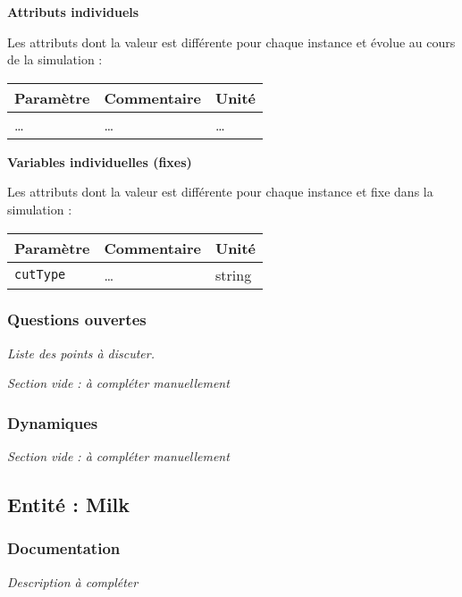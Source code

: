 \documentclass[
]{article}
\begin{document}
\textbf{Attributs individuels}

Les attributs dont la valeur est différente pour chaque instance et
évolue au cours de la simulation :

\begin{longtable}[]{@{}lll@{}}
\toprule\noalign{}
\textbf{Paramètre} & \textbf{Commentaire} & \textbf{Unité} \\
\midrule\noalign{}
\endhead
\bottomrule\noalign{}
\endlastfoot
\ldots{} & \ldots{} & \ldots{} \\
\end{longtable}

\textbf{Variables individuelles (fixes)}

Les attributs dont la valeur est différente pour chaque instance et fixe
dans la simulation :

\begin{longtable}[]{@{}lll@{}}
\toprule\noalign{}
\textbf{Paramètre} & \textbf{Commentaire} & \textbf{Unité} \\
\midrule\noalign{}
\endhead
\bottomrule\noalign{}
\endlastfoot
\texttt{cutType} & \ldots{} & string \\
\end{longtable}

\subsubsection{Questions ouvertes}\label{questions-ouvertes-7}

\emph{Liste des points à discuter.}

\emph{Section vide : à compléter manuellement}

\subsubsection{Dynamiques}\label{dynamiques-7}

\emph{Section vide : à compléter manuellement}

\subsection{Entité : Milk}\label{entituxe9-milk}

\subsubsection{Documentation}\label{documentation-12}

\emph{Description à compléter}
\end{document}
